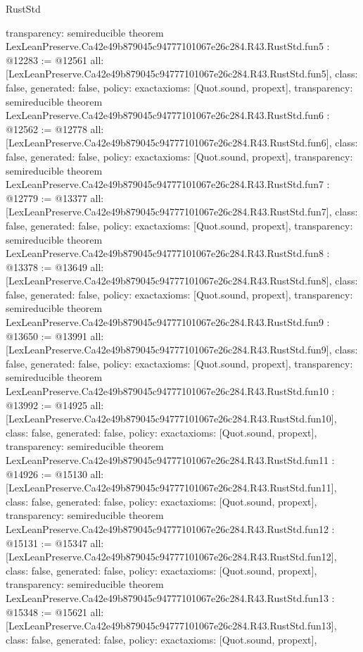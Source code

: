 \begin{lexlean}{RustStd}
\begin{coremodule}
{  transparency: semireducible
}
theorem LexLeanPreserve.Ca42e49b879045c94777101067e26c284.R43.RustStd.fun5 : @12283 := @12561 {
  all: [LexLeanPreserve.Ca42e49b879045c94777101067e26c284.R43.RustStd.fun5],
  class: false,
  generated: false,
  policy: exact{axioms: [Quot.sound, propext]},
  transparency: semireducible
}
theorem LexLeanPreserve.Ca42e49b879045c94777101067e26c284.R43.RustStd.fun6 : @12562 := @12778 {
  all: [LexLeanPreserve.Ca42e49b879045c94777101067e26c284.R43.RustStd.fun6],
  class: false,
  generated: false,
  policy: exact{axioms: [Quot.sound, propext]},
  transparency: semireducible
}
theorem LexLeanPreserve.Ca42e49b879045c94777101067e26c284.R43.RustStd.fun7 : @12779 := @13377 {
  all: [LexLeanPreserve.Ca42e49b879045c94777101067e26c284.R43.RustStd.fun7],
  class: false,
  generated: false,
  policy: exact{axioms: [Quot.sound, propext]},
  transparency: semireducible
}
theorem LexLeanPreserve.Ca42e49b879045c94777101067e26c284.R43.RustStd.fun8 : @13378 := @13649 {
  all: [LexLeanPreserve.Ca42e49b879045c94777101067e26c284.R43.RustStd.fun8],
  class: false,
  generated: false,
  policy: exact{axioms: [Quot.sound, propext]},
  transparency: semireducible
}
theorem LexLeanPreserve.Ca42e49b879045c94777101067e26c284.R43.RustStd.fun9 : @13650 := @13991 {
  all: [LexLeanPreserve.Ca42e49b879045c94777101067e26c284.R43.RustStd.fun9],
  class: false,
  generated: false,
  policy: exact{axioms: [Quot.sound, propext]},
  transparency: semireducible
}
theorem LexLeanPreserve.Ca42e49b879045c94777101067e26c284.R43.RustStd.fun10 : @13992 := @14925 {
  all: [LexLeanPreserve.Ca42e49b879045c94777101067e26c284.R43.RustStd.fun10],
  class: false,
  generated: false,
  policy: exact{axioms: [Quot.sound, propext]},
  transparency: semireducible
}
theorem LexLeanPreserve.Ca42e49b879045c94777101067e26c284.R43.RustStd.fun11 : @14926 := @15130 {
  all: [LexLeanPreserve.Ca42e49b879045c94777101067e26c284.R43.RustStd.fun11],
  class: false,
  generated: false,
  policy: exact{axioms: [Quot.sound, propext]},
  transparency: semireducible
}
theorem LexLeanPreserve.Ca42e49b879045c94777101067e26c284.R43.RustStd.fun12 : @15131 := @15347 {
  all: [LexLeanPreserve.Ca42e49b879045c94777101067e26c284.R43.RustStd.fun12],
  class: false,
  generated: false,
  policy: exact{axioms: [Quot.sound, propext]},
  transparency: semireducible
}
theorem LexLeanPreserve.Ca42e49b879045c94777101067e26c284.R43.RustStd.fun13 : @15348 := @15621 {
  all: [LexLeanPreserve.Ca42e49b879045c94777101067e26c284.R43.RustStd.fun13],
  class: false,
  generated: false,
  policy: exact{axioms: [Quot.sound, propext]},
}
\end{coremodule}
\end{lexlean}
